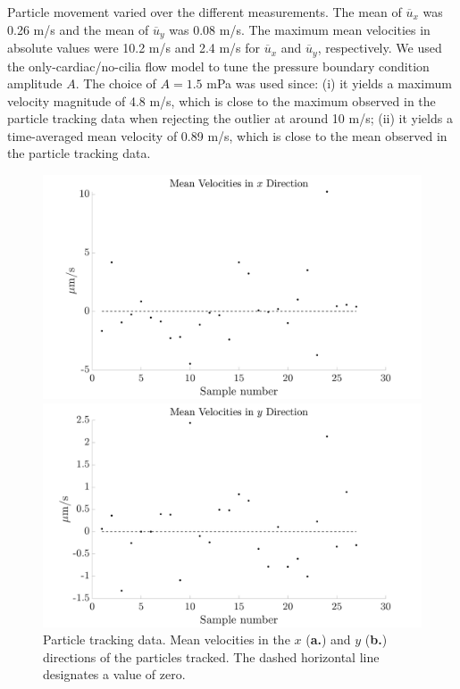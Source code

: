 \documentclass{WileyMSP-template}
\begin{document}
Particle movement varied over the different measurements. The mean of $\overline{u}_x$ was
0.26 \textmu m/s and the mean of $\overline{u}_y$ was 0.08 \textmu m/s.
The maximum mean velocities
in absolute values were 10.2 \textmu m/s and 2.4 \textmu m/s for
$\overline{u}_x$ and $\overline{u}_y$,
respectively. We used the only-cardiac/no-cilia flow model to tune the
pressure boundary condition
amplitude $A$. The choice of $A=1.5$ mPa was used since: (i) it yields a
maximum velocity magnitude
of 4.8 \textmu m/s, which is close to the maximum observed in the
particle tracking data when
rejecting the outlier at around 10 \textmu m/s; (ii) it yields a time-averaged mean velocity
of 0.89 \textmu m/s, which is close to the mean observed in the particle tracking data.
\begin{figure}[H]
    \begin{minipage}[t]{0.49\textwidth}
        \includegraphics[width=\textwidth]{graphics/mean_velocities_x.png}
    \end{minipage}
    \begin{minipage}[t]{0.49\textwidth}
        \includegraphics[width=\textwidth]{graphics/mean_velocities_y.png}
    \end{minipage} 
    \caption{Particle tracking data. Mean velocities in
    the $x$ (\textbf{a.}) and $y$ (\textbf{b.}) directions of the particles tracked.
    The dashed horizontal line designates a value of zero.}\label{fig:particle_tracking_data}
\end{figure}
\end{document}

